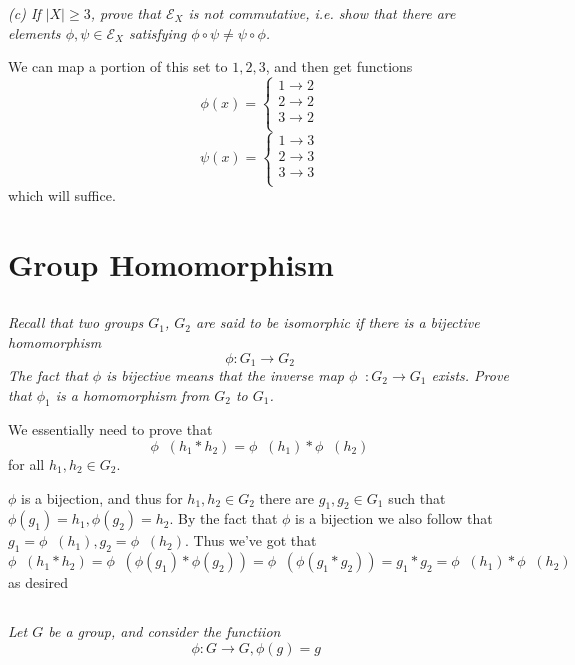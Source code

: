 \documentclass[11pt,oneside,titlepage]{book}
\DeclareMathOperator \inv {^{-1}}
\begin{document}
\textit{(c) If $|X| \geq 3$, prove that $\mathcal{E}_X$ is not commutative, i.e.
  show that there are elements $\phi, \psi \in \mathcal{E}_X$ satisfying
  $\phi \circ \psi \neq \psi \circ \phi$.}

We can map a portion of this set to ${1, 2, 3}$, and then get functions
$$\phi(x) =
\begin{cases}
  1 \to 2 \\
  2 \to 2 \\
  3 \to 2 \\ 
\end{cases}
$$
$$\psi(x) =
\begin{cases}
  1 \to 3 \\
  2 \to 3 \\
  3 \to 3 \\ 
\end{cases}
$$
which will suffice.

\section{Group Homomorphism}

\subsection{}

\textit{Recall that two groups $G_1$, $G_2$ are said to be isomorphic
  if there is a bijective homomorphism
  $$\phi: G_1 \to G_2$$
  The fact that $\phi$ is bijective means that the inverse map $\phi \inv : G_2 \to G_1$ exists.
  Prove that $\phi_1$ is a homomorphism from $G_2$ to $G_1$. 
}

We essentially need to prove that
$$\phi\inv(h_1 * h_2) = \phi \inv (h_1) * \phi \inv (h_2)$$
for all $h_1, h_2 \in G_2$.

$\phi$ is a bijection, and thus for $h_1, h_2 \in G_2$ there are $g_1, g_2 \in G_1$ such that
$\phi(g_1) = h_1, \phi(g_2) = h_2$. By the fact that $\phi$ is a bijection we also follow that
$g_1 = \phi\inv(h_1), g_2 = \phi\inv(h_2)$. Thus we've got that 
$$\phi\inv(h_1 * h_2) = \phi\inv(\phi(g_1) * \phi(g_2)) =
\phi\inv(\phi(g_1 * g_2)) = g_1 * g_2  = \phi\inv(h_1) * \phi\inv(h_2) $$
as desired

\subsection{}

\textit{Let $G$ be a group, and consider the functiion
  $$\phi: G \to G, \phi(g) = g\inv$$
}
\end{document}

